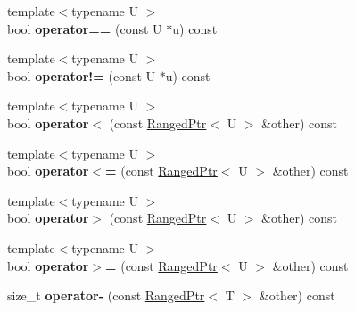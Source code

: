\begin{DoxyCompactItemize}
\item 
\hypertarget{classmozilla_1_1_ranged_ptr_acf7dfe86db84feedce60c614cdd3b871}{{\footnotesize template$<$typename U $>$ }\\bool {\bfseries operator==} (const U $\ast$u) const }\label{classmozilla_1_1_ranged_ptr_acf7dfe86db84feedce60c614cdd3b871}

\item 
\hypertarget{classmozilla_1_1_ranged_ptr_a537dd06b5fa857d0d8d5c722ec7531fd}{{\footnotesize template$<$typename U $>$ }\\bool {\bfseries operator!=} (const U $\ast$u) const }\label{classmozilla_1_1_ranged_ptr_a537dd06b5fa857d0d8d5c722ec7531fd}

\item 
\hypertarget{classmozilla_1_1_ranged_ptr_a860de8b9a9db1a90fc6f0a5907dbcf3a}{{\footnotesize template$<$typename U $>$ }\\bool {\bfseries operator$<$} (const \hyperlink{classmozilla_1_1_ranged_ptr}{Ranged\-Ptr}$<$ U $>$ \&other) const }\label{classmozilla_1_1_ranged_ptr_a860de8b9a9db1a90fc6f0a5907dbcf3a}

\item 
\hypertarget{classmozilla_1_1_ranged_ptr_ac5f26a226059da5196a53ce2a188e7f5}{{\footnotesize template$<$typename U $>$ }\\bool {\bfseries operator$<$=} (const \hyperlink{classmozilla_1_1_ranged_ptr}{Ranged\-Ptr}$<$ U $>$ \&other) const }\label{classmozilla_1_1_ranged_ptr_ac5f26a226059da5196a53ce2a188e7f5}

\item 
\hypertarget{classmozilla_1_1_ranged_ptr_a5b00178690366295e553bd953292b15a}{{\footnotesize template$<$typename U $>$ }\\bool {\bfseries operator$>$} (const \hyperlink{classmozilla_1_1_ranged_ptr}{Ranged\-Ptr}$<$ U $>$ \&other) const }\label{classmozilla_1_1_ranged_ptr_a5b00178690366295e553bd953292b15a}

\item 
\hypertarget{classmozilla_1_1_ranged_ptr_a3fccab34766640d37c7ff057147db528}{{\footnotesize template$<$typename U $>$ }\\bool {\bfseries operator$>$=} (const \hyperlink{classmozilla_1_1_ranged_ptr}{Ranged\-Ptr}$<$ U $>$ \&other) const }\label{classmozilla_1_1_ranged_ptr_a3fccab34766640d37c7ff057147db528}

\item 
\hypertarget{classmozilla_1_1_ranged_ptr_a65a2a52794071c6b0e4cede666d64cff}{size\-\_\-t {\bfseries operator-\/} (const \hyperlink{classmozilla_1_1_ranged_ptr}{Ranged\-Ptr}$<$ T $>$ \&other) const }\label{classmozilla_1_1_ranged_ptr_a65a2a52794071c6b0e4cede666d64cff}

\end{DoxyCompactItemize}
